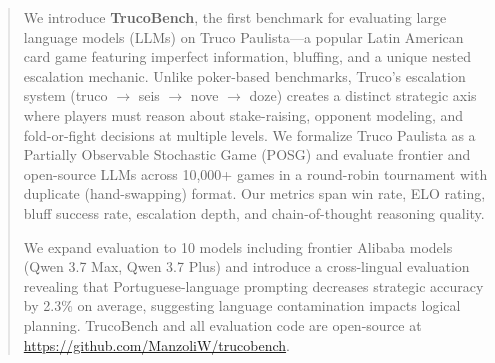 \begin{abstract}
We introduce \textbf{TrucoBench}, the first benchmark for evaluating large language models (LLMs) on Truco Paulista---a popular Latin American card game featuring imperfect information, bluffing, and a unique nested escalation mechanic. Unlike poker-based benchmarks, Truco's escalation system (truco $\to$ seis $\to$ nove $\to$ doze) creates a distinct strategic axis where players must reason about stake-raising, opponent modeling, and fold-or-fight decisions at multiple levels. We formalize Truco Paulista as a Partially Observable Stochastic Game (POSG) and evaluate frontier and open-source LLMs across 10{,}000+ games in a round-robin tournament with duplicate (hand-swapping) format. Our metrics span win rate, ELO rating, bluff success rate, escalation depth, and chain-of-thought reasoning quality. 

We expand evaluation to 10 models including frontier Alibaba models (Qwen 3.7 Max, Qwen 3.7 Plus) and introduce a cross-lingual evaluation revealing that Portuguese-language prompting decreases strategic accuracy by 2.3\% on average, suggesting language contamination impacts logical planning. TrucoBench and all evaluation code are open-source at \url{https://github.com/ManzoliW/trucobench}.
\end{abstract}